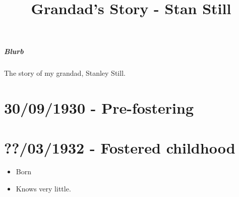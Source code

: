 \documentclass[10pt,twocolumn,letterpaper]{article}
\begin{document}
\title{Grandad's Story - Stan Still}
\maketitle

\tableofcontents
\clearpage


\subparagraph{Blurb}
The story of my grandad, Stanley Still.

\section{30/09/1930 - Pre-fostering}
\label{section:empirical_analysis}

\section{??/03/1932 - Fostered childhood}
\begin{itemize}
    \item Born
    \item Knows very little.
\end{itemize}
\end{document}
